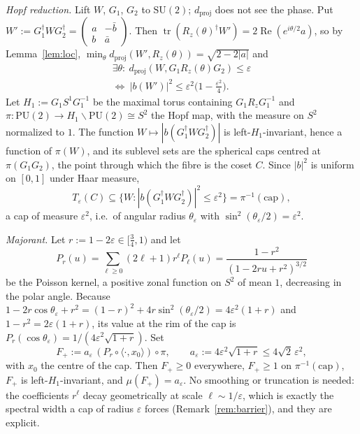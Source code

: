 \documentclass[aps,prx,twocolumn,superscriptaddress,nofootinbib,longbibliography]{revtex4-2}
\theoremstyle{plain}
\theoremstyle{definition}
\theoremstyle{remark}
\newcommand{\dproj}{d_{\mathrm{proj}}}
\newcommand{\PU}{\mathrm{PU}(2)}
\newcommand{\SU}{\mathrm{SU}(2)}
\newcommand{\tr}{\operatorname{tr}}
\begin{document}
\emph{Hopf reduction.} Lift $W$, $G_1$, $G_2$ to $\SU$; $\dproj$ does not see the phase. Put $W':=G_1^\dagger WG_2^\dagger=\begin{pmatrix}a&-\bar b\\ b&\bar a\end{pmatrix}$. Then $\tr(R_z(\theta)^\dagger W')=2\operatorname{Re}(e^{i\theta/2}a)$, so by Lemma~\ref{lem:loc}, $\min_\theta\dproj(W',R_z(\theta))=\sqrt{2-2|a|}$ and
\begin{multline}\label{eq:btube}
\exists\theta:\ \dproj(W,G_1R_z(\theta)G_2)\le\varepsilon\\
\iff\ |b(W')|^2\le\varepsilon^2\big(1-\tfrac{\varepsilon^2}4\big).
\end{multline}
Let $H_1:=G_1S^1G_1^{-1}$ be the maximal torus containing $G_1R_zG_1^{-1}$ and $\pi:\PU\to H_1\backslash\PU\cong S^2$ the Hopf map, with the measure on $S^2$ normalized to $1$. The function $W\mapsto|b(G_1^\dagger WG_2^\dagger)|$ is left-$H_1$-invariant, hence a function of $\pi(W)$, and its sublevel sets are the spherical caps centred at $\pi(G_1G_2)$, the point through which the fibre is the coset $C$. Since $|b|^2$ is uniform on $[0,1]$ under Haar measure,
\begin{equation}
T_\varepsilon(C)\subseteq\{W:|b(G_1^\dagger WG_2^\dagger)|^2\le\varepsilon^2\}=\pi^{-1}(\mathrm{cap}),
\end{equation}
a cap of measure $\varepsilon^2$, i.e.\ of angular radius $\theta_\varepsilon$ with $\sin^2(\theta_\varepsilon/2)=\varepsilon^2$.

\emph{Majorant.} Let $r:=1-2\varepsilon\in[\tfrac34,1)$ and let
\begin{equation}
P_r(u)=\sum_{\ell\ge0}(2\ell+1)r^\ell P_\ell(u)=\frac{1-r^2}{(1-2ru+r^2)^{3/2}}
\end{equation}
be the Poisson kernel, a positive zonal function on $S^2$ of mean $1$, decreasing in the polar angle. Because $1-2r\cos\theta_\varepsilon+r^2=(1-r)^2+4r\sin^2(\theta_\varepsilon/2)=4\varepsilon^2(1+r)$ and $1-r^2=2\varepsilon(1+r)$, its value at the rim of the cap is $P_r(\cos\theta_\varepsilon)=1/(4\varepsilon^2\sqrt{1+r})$. Set
\begin{equation}
F_+:=a_\varepsilon\,(P_r\circ\langle\cdot,x_0\rangle)\circ\pi,\qquad a_\varepsilon:=4\varepsilon^2\sqrt{1+r}\le4\sqrt2\,\varepsilon^2,
\end{equation}
with $x_0$ the centre of the cap. Then $F_+\ge0$ everywhere, $F_+\ge1$ on $\pi^{-1}(\mathrm{cap})$, $F_+$ is left-$H_1$-invariant, and $\mu(F_+)=a_\varepsilon$. No smoothing or truncation is needed: the coefficients $r^\ell$ decay geometrically at scale $\ell\sim1/\varepsilon$, which is exactly the spectral width a cap of radius $\varepsilon$ forces (Remark~\ref{rem:barrier}), and they are explicit.
\end{document}
